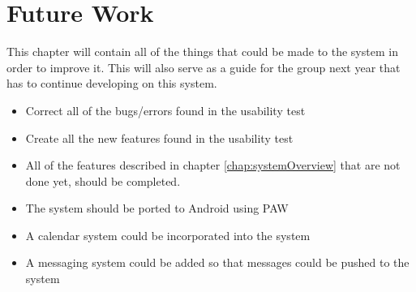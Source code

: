 \chapter{Future Work}
\label{chap:futureWork}
This chapter will contain all of the things that could be made to the system in order to improve it. This will also serve as a guide for the group next year that has to continue developing on this system.
\begin{itemize}
\item Correct all of the bugs/errors found in the usability test
\item Create all the new features found in the usability test
\item All of the features described in chapter \vref{chap:systemOverview} that are not done yet, should be completed.
\item The system should be ported to Android using PAW
\item A calendar system could be incorporated into the system
\item A messaging system could be added so that messages could be pushed to the system
\end{itemize}